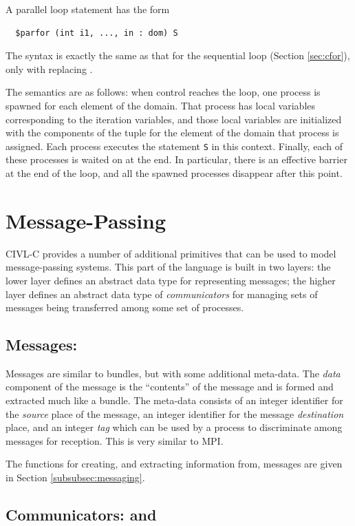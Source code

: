 A parallel loop statement has the form
\begin{verbatim}
  $parfor (int i1, ..., in : dom) S
\end{verbatim}
The syntax is exactly the same as that for the sequential loop \cfor
(Section \ref{sec:cfor}), only with \cparfor{} replacing \cfor.

The semantics are as follows: when control reaches the loop, one
process is spawned for each element of the domain.  That process has
local variables corresponding to the iteration variables, and those
local variables are initialized with the components of the tuple for
the element of the domain that process is assigned.  Each process
executes the statement \texttt{S} in this context.  Finally, each of
these processes is waited on at the end.  In particular, there is an
effective barrier at the end of the loop, and all the spawned
processes disappear after this point.

\section{Message-Passing}

CIVL-C provides a number of additional primitives that can be used to
model message-passing systems.  This part of the language is built in
two layers: the lower layer defines an abstract data type for
representing messages; the higher layer defines an abstract data type
of \emph{communicators} for managing sets of messages being
transferred among some set of processes.

\subsection{Messages: \cmessage}

Messages are similar to bundles, but with some additional meta-data.
The \emph{data} component of the message is the ``contents'' of the
message and is formed and extracted much like a bundle.  The meta-data
consists of an integer identifier for the \emph{source} place of the
message, an integer identifier for the message \emph{destination}
place, and an integer \emph{tag} which can be used by a process to
discriminate among messages for reception.  This is very similar to
MPI.

The functions for creating, and extracting information from, messages
are given in Section \ref{subsubsec:messaging}.

\subsection{Communicators: \cgcomm{} and \ccomm}
\label{sec:communicators}

